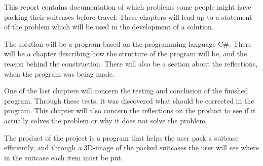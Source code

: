 This report contains documentation of which problems some people might have packing their suitcases before travel. These chapters will lead up to a statement of the problem which will be used in the development of a solution.


The solution will be a program based on the programming language C\#. There will be a chapter describing how the structure of the program will be, and the reason behind the construction. There will also be a section about the reflections, when the program was being made.


One of the last chapters will concern the testing and conclusion of the finished program. Through these tests, it was discovered what should be corrected in the program. This chapter will also concern the reflections on the product to see if it actually solves the problem or why it does not solve the problem.


The product of the project is a program that helps the user pack a suitcase efficiently, and through a 3D-image of the packed suitcases the user will see where in the suitcase each item must be put.